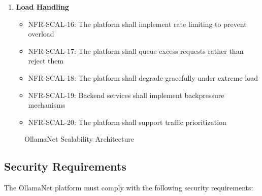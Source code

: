 \begin{enumerate}
   \item \textbf{Load Handling}
   \begin{itemize}
      \item NFR-SCAL-16: The platform shall implement rate limiting to prevent overload
      \item NFR-SCAL-17: The platform shall queue excess requests rather than reject them
      \item NFR-SCAL-18: The platform shall degrade gracefully under extreme load
      \item NFR-SCAL-19: Backend services shall implement backpressure mechanisms
      \item NFR-SCAL-20: The platform shall support traffic prioritization
   \end{itemize}
\end{enumerate}

\begin{figure}
    \centering
    \caption{OllamaNet Scalability Architecture}
    \label{fig:scalability-architecture}
\end{figure}

\subsection{Security Requirements}

The OllamaNet platform must comply with the following security requirements:

